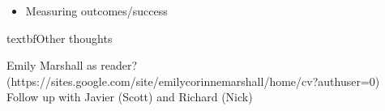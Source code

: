 \documentclass{article}
\begin{document}
\begin{itemize}
\begin{itemize}
    \begin{itemize}
    \item
      Measuring outcomes/success
    \end{itemize}
  \end{itemize}
\end{itemize}

textbf{Other thoughts}

Emily Marshall as reader? (https://sites.google.com/site/emilycorinnemarshall/home/cv?authuser=0) 
Follow up with Javier (Scott) and Richard (Nick)
\end{document}
